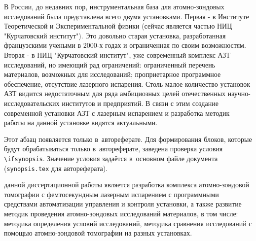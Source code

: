 В России, до недавних пор, инструментальная база для атомно-зондовых исследований была представлена всего двумя установками. Первая - в Институте Теоретической и Экспериментальной физики (сейчас является частью НИЦ "Курчатовский институт"). Это довольно старая установка, разработанная французскими учеными в 2000-х годах и ограниченная по своим возможностям. Вторая - в НИЦ "Курчатовский институт", уже современный комплекс АЗТ исследований, но имеющий рад ограничений: ограниченный перечень материалов, возможных для исследований; проприетарное программное обеспечение, отсутствие лазерного испарения. Столь малое количество установок АЗТ видится недостаточным для ряда амбициозных целей отечественных научно-исследовательских институтов и предприятий. В связи с этим создание современной установки АЗТ с лазерным испарением и разработка методик работы на данной установке видятся актуальными.

\ifsynopsis
Этот абзац появляется только в~автореферате.
Для формирования блоков, которые будут обрабатываться только в~автореферате,
заведена проверка условия \verb!\!\verb!ifsynopsis!.
Значение условия задаётся в~основном файле документа (\verb!synopsis.tex! для
автореферата).
\else
\fi


{\aim} данной диссертационной работы является разработка комплекса атомно-зондовой томографии с фемтосекундным лазерным испарением с программными средствами автоматизации управления и контроля установки, а также развитие методик проведения атомно-зондовых исследований материалов, в том числе: методика определения условий исследований, методика сравнения исследований с помощью атомно-зондовой томографии на разных установках.

